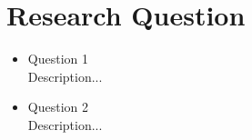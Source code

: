 \section{Research Question}

\begin{itemize}
	\item Question 1\\
	{\small Description...}
	
	\item  Question 2\\
	{\small Description...}
\end{itemize}